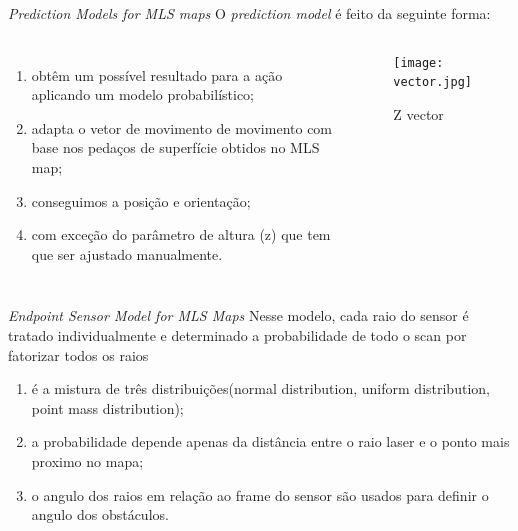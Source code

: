 \begin{frame}[c]{\textit{Prediction Models for MLS maps}}
    O \textit{prediction model} é feito da seguinte forma:

    \begin{columns}[t]
            \begin{enumerate}
                \item obtêm um possível resultado para a ação aplicando um modelo probabilístico;
                \item adapta o vetor de movimento de movimento com base nos pedaços de superfície obtidos no MLS map;
                \item conseguimos a posição e orientação;
                \item com exceção do parâmetro de altura (z)  que tem que ser ajustado manualmente.
            \end{enumerate}
        \begin{center}
            \begin{figure}
                \texttt{[image: vector.jpg]}
                \caption{Z vector\cite{article}}
            \end{figure}
        \end{center}
    \end{columns}

\end{frame}

\begin{frame}[c]{\textit{Endpoint Sensor Model for MLS Maps}}
    Nesse modelo, cada raio do sensor é tratado individualmente e determinado a probabilidade de todo o scan por fatorizar todos os raios
    \newline

    \begin{enumerate}
        \item é a mistura de três distribuições(normal distribution, uniform distribution, point mass distribution);
        \item a probabilidade depende apenas da distância entre o raio laser e o ponto mais proximo no mapa;
        \item o angulo dos raios em relação ao frame do sensor são usados para definir o angulo dos obstáculos.
    \end{enumerate}

\end{frame}

